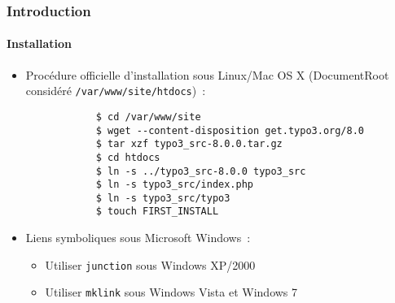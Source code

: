 \begin{frame}[fragile]
	\frametitle{Introduction}
	\framesubtitle{Installation}

	\begin{itemize}
		\item Procédure officielle d'installation sous Linux/Mac OS X\newline
			(DocumentRoot considéré \texttt{/var/www/site/htdocs})~:
		\begin{lstlisting}
			$ cd /var/www/site
			$ wget --content-disposition get.typo3.org/8.0
			$ tar xzf typo3_src-8.0.0.tar.gz
			$ cd htdocs
			$ ln -s ../typo3_src-8.0.0 typo3_src
			$ ln -s typo3_src/index.php
			$ ln -s typo3_src/typo3
			$ touch FIRST_INSTALL
		\end{lstlisting}

		\item Liens symboliques sous Microsoft Windows~:

			\begin{itemize}
				\item Utiliser \texttt{junction} sous Windows XP/2000
				\item Utiliser \texttt{mklink} sous Windows Vista et Windows 7
			\end{itemize}

	\end{itemize}
\end{frame}


